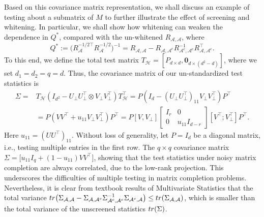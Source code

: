 \documentclass[12pt]{article}
\def\calA{{\mathcal A}}
\def\calH{{\mathcal H}}
\theoremstyle{plain}
\begin{document}
Based on this covariance matrix representation, we shall discuss an example of testing about a submatrix of $M$ to further illustrate the effect of screening and whitening. In particular, we shall show how whitening can weaken the dependence in $Q^{\ast}$, compared with the un-whitened $R_{\calA,\calA}$, where
$$
Q^{\ast}:=\big(R_{\calA}^{-1/2\top} R_{\calA}^{-1/2}\big)^{-1}=R_{\calA,\calA} - R_{\calA,\calA^c}R_{\calA^c,\calA^c}^{-1}R_{\calA,\calA^c}^\top.
$$
To this end, we define the total test matrix $T_{\calH}=[P_{d\times d},\boldsymbol{0}_{d\times(d^2-d) }]$, where we set $d_1=d_2=q=d$. Thus, the covariance matrix of our un-standardized test statistics is
\begin{equation*}
\begin{aligned}
        \Sigma = & T_{\calH}\left(I_{d^2} -  U_\perp U_\perp^\top \otimes V_\perp V_\perp^\top\right)T_{\calH}^\top =  P\left(I_d - \left(U_\perp U_\perp^\top\right)_{11}V_\perp V_\perp^\top \right) P^\top \\ 
        & = P \left(VV^\top +u_{11}V_\perp V_\perp^\top \right)P^{\top} = P \left[V, V_\perp\right] \left[\begin{matrix} I_r & 0 \\0 & u_{11} I_{d-r}
        \end{matrix}\right] \left[V^\top; V_\perp^\top \right]P^\top.
\end{aligned}
\end{equation*}
Here $u_{11}= \left(UU^\top\right)_{11}$. Without loss of generality, let $P=I_d$ be a diagonal matrix, i.e., testing multiple entries in the first row. The $q\times q$ covariance matrix  $\Sigma=\big[u_{11}I_q+(1-u_{11})VV^{\top}\big]$, showing that the test statistics under noisy matrix completion are always correlated, due to the low-rank projection. This underscores the difficulties of multiple testing in matrix completion problems. Nevertheless, it is clear from textbook results of Multivariate Statistics that the total variance ${\rm tr}\big(\Sigma_{\calA,\calA}-\Sigma_{\calA,\calA^{\rm c}}\Sigma_{\calA^{\rm c},\calA^{\rm c}}^{-1}\Sigma_{\calA^{\rm c}, \calA}\big)\leq {\rm tr}(\Sigma_{\calA,\calA})$, which is smaller than the total variance of the unscreened statistics ${\rm tr}(\Sigma)$.
\end{document}
